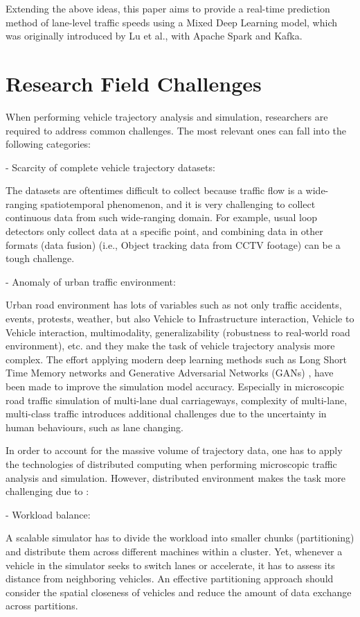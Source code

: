 \documentclass{article}
\begin{document}
Extending the above ideas, this paper aims to provide a real-time prediction method of lane-level traffic speeds using a Mixed Deep Learning model, which was originally introduced by Lu et al.\cite{9284587}, with Apache Spark and Kafka. 

\section{Research Field Challenges}
\label{sec:challenges} %
When performing vehicle trajectory analysis and simulation, researchers are required to address common challenges. The most relevant ones can fall into the following categories:

- Scarcity of complete vehicle trajectory datasets: 

The datasets are oftentimes difficult to collect because traffic flow is a wide-ranging spatiotemporal phenomenon, and it is very challenging to collect continuous data from such wide-ranging domain\cite{seo2020evaluation}. For example, usual loop detectors only collect data at a specific point, and combining data in other formats (data fusion) (i.e., Object tracking data from CCTV footage) can be a tough challenge.

- Anomaly of urban traffic environment: 

Urban road environment has lots of variables such as not only traffic accidents, events, protests, weather, but also Vehicle to Infrastructure interaction, Vehicle to Vehicle interaction, multimodality, generalizability (robustness to real-world road environment), etc. and they make the task of vehicle trajectory analysis more complex. The effort applying modern deep learning methods such as Long Short Time Memory networks and Generative Adversarial Networks (GANs) \cite{rossi2021vehicle}, have been made to improve the simulation model accuracy. Especially in microscopic road traffic simulation of multi-lane dual carriageways, complexity of multi-lane, multi-class traffic introduces additional challenges due to the uncertainty in human behaviours, such as lane changing\cite{DAHIYA2022100066}. 

In order to account for the massive volume of trajectory data, one has to apply the technologies of distributed computing when performing microscopic traffic analysis and simulation. However, distributed environment makes the task more challenging due to \cite{yu2020dissecting}: 

- Workload balance: 

A scalable simulator has to divide the workload into smaller chunks (partitioning) and distribute them across different machines within a cluster. Yet, whenever a vehicle in the simulator seeks to switch lanes or accelerate, it has to assess its distance from neighboring vehicles. An effective partitioning approach should consider the spatial closeness of vehicles and reduce the amount of data exchange across partitions. 
\end{document}
